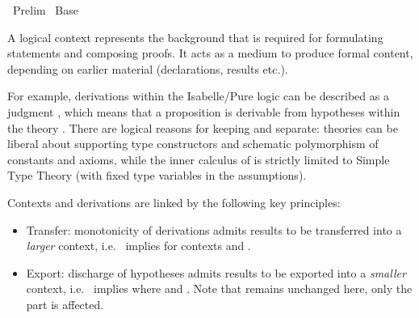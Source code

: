 %
\begin{isabellebody}%
\def\isabellecontext{Prelim}%
%
\isadelimtheory
%
\endisadelimtheory
%
\isatagtheory
{}\isamarkupfalse%
\ Prelim\isanewline
{}\ Base\isanewline
{}%
\endisatagtheory
{\isafoldtheory}%
%
\isadelimtheory
%
\endisadelimtheory
%
\isamarkuptrue%
%
\isamarkuptrue%
%
\begin{isamarkuptext}%
A logical context represents the background that is required for
  formulating statements and composing proofs.  It acts as a medium to
  produce formal content, depending on earlier material (declarations,
  results etc.).

  For example, derivations within the Isabelle/Pure logic can be
  described as a judgment \isa{{\isasymGamma}\ {\isasymturnstile}\isactrlsub {\isasymTheta}\ {\isasymphi}}, which means that a
  proposition \isa{{\isasymphi}} is derivable from hypotheses \isa{{\isasymGamma}}
  within the theory \isa{{\isasymTheta}}.  There are logical reasons for
  keeping \isa{{\isasymTheta}} and \isa{{\isasymGamma}} separate: theories can be
  liberal about supporting type constructors and schematic
  polymorphism of constants and axioms, while the inner calculus of
  \isa{{\isasymGamma}\ {\isasymturnstile}\ {\isasymphi}} is strictly limited to Simple Type Theory (with
  fixed type variables in the assumptions).

  \medskip Contexts and derivations are linked by the following key
  principles:

  \begin{itemize}

  \item Transfer: monotonicity of derivations admits results to be
  transferred into a \emph{larger} context, i.e.\ \isa{{\isasymGamma}\ {\isasymturnstile}\isactrlsub {\isasymTheta}\ {\isasymphi}} implies \isa{{\isasymGamma}{\isacharprime}\ {\isasymturnstile}\isactrlsub {\isasymTheta}\isactrlsub {\isacharprime}\ {\isasymphi}} for contexts \isa{{\isasymTheta}{\isacharprime}\ {\isasymsupseteq}\ {\isasymTheta}} and \isa{{\isasymGamma}{\isacharprime}\ {\isasymsupseteq}\ {\isasymGamma}}.

  \item Export: discharge of hypotheses admits results to be exported
  into a \emph{smaller} context, i.e.\ \isa{{\isasymGamma}{\isacharprime}\ {\isasymturnstile}\isactrlsub {\isasymTheta}\ {\isasymphi}}
  implies \isa{{\isasymGamma}\ {\isasymturnstile}\isactrlsub {\isasymTheta}\ {\isasymDelta}\ {\isasymLongrightarrow}\ {\isasymphi}} where \isa{{\isasymGamma}{\isacharprime}\ {\isasymsupseteq}\ {\isasymGamma}} and
  \isa{{\isasymDelta}\ {\isacharequal}\ {\isasymGamma}{\isacharprime}\ {\isacharminus}\ {\isasymGamma}}.  Note that \isa{{\isasymTheta}} remains unchanged here,
  only the \isa{{\isasymGamma}} part is affected.


\end{itemize}
\end{isamarkuptext}
\end{isabellebody}
